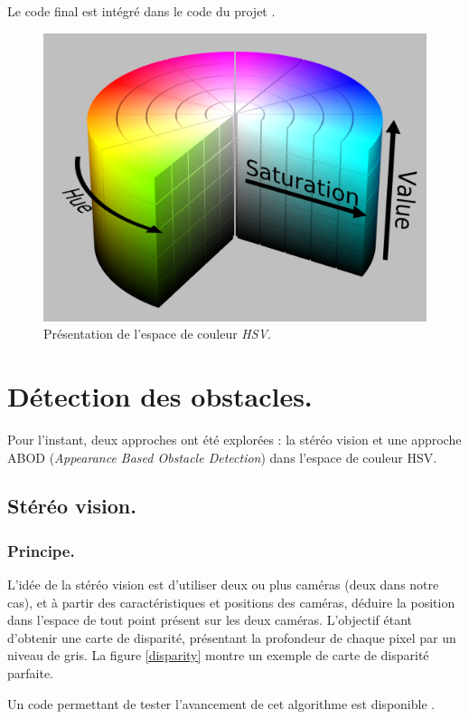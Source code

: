 \documentclass{article}
\begin{document}
Le code final est intégré dans le code du projet \cite{ppefinal}.

\begin{figure}
    \begin{center}
        \includegraphics[width=0.75\linewidth]{rcs/hsv.png}
    \end{center}
    \caption{Présentation de l'espace de couleur \emph{HSV}.}
    \label{hsv}
\end{figure}



\section{Détection des obstacles.}
Pour l'instant, deux approches ont été explorées : la stéréo vision et une approche ABOD (\emph{Appearance Based Obstacle Detection}) dans l'espace de couleur HSV.

\subsection{Stéréo vision.}
\subsubsection{Principe.} L'idée de la stéréo vision est d'utiliser deux ou plus caméras (deux dans notre cas), et à partir des caractéristiques et positions des caméras, déduire la position dans l'espace de tout point présent sur les deux caméras. L'objectif étant d'obtenir une carte de disparité, présentant la profondeur de chaque pixel par un niveau de gris. La figure \ref{disparity} montre un exemple de carte de disparité parfaite.

Un code permettant de tester l'avancement de cet algorithme est disponible \cite{ppestereo}.
\end{document}
